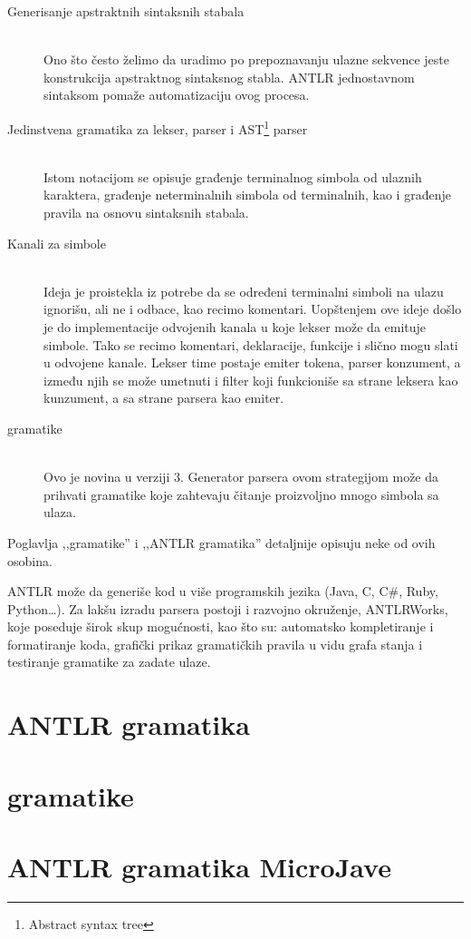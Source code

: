 \begin{description}
	\item[Generisanje apstraktnih sintaksnih stabala] \hfill \\
	Ono što često želimo da uradimo po prepoznavanju ulazne sekvence jeste konstrukcija apstraktnog sintaksnog stabla. ANTLR jednostavnom sintaksom pomaže automatizaciju ovog procesa.
	\item[Jedinstvena gramatika za lekser, parser i AST\footnote{\skr \eng Abstract syntax tree}  parser] \hfill \\
	Istom notacijom se opisuje građenje terminalnog simbola od ulaznih karaktera, građenje neterminalnih simbola od terminalnih, kao i građenje pravila na osnovu sintaksnih stabala.
	\item[Kanali za simbole] \hfill \\
	Ideja je proistekla iz potrebe da se određeni terminalni simboli na ulazu ignorišu, ali ne i odbace, kao recimo komentari. 
Uopštenjem ove ideje došlo je do implementacije odvojenih kanala u koje lekser može da emituje simbole. Tako se recimo komentari, deklaracije, funkcije i slično mogu slati u odvojene kanale. 
Lekser time postaje emiter tokena, parser konzument, a između njih se može umetnuti i filter koji funkcioniše sa strane leksera kao kunzument, a sa strane parsera kao emiter.
	\item [\LLa gramatike] \hfill \\
	Ovo je novina u verziji 3. Generator parsera ovom strategijom može da prihvati gramatike koje zahtevaju čitanje proizvoljno mnogo simbola sa ulaza.

\end{description}

Poglavlja ,,\LLa gramatike'' i ,,ANTLR gramatika'' detaljnije opisuju neke od ovih osobina.
  
ANTLR može da generiše kod u više programskih jezika (Java, C, C\#, Ruby, Python\ldots). 
Za lakšu izradu parsera postoji i razvojno okruženje, ANTLRWorks, koje poseduje širok skup mogućnosti, kao što su: 
automatsko kompletiranje i formatiranje koda, grafički prikaz gramatičkih pravila u vidu grafa stanja i testiranje gramatike za zadate ulaze.


\section{ANTLR gramatika}


\section{\LLa gramatike}





\section{ANTLR gramatika MicroJave}
